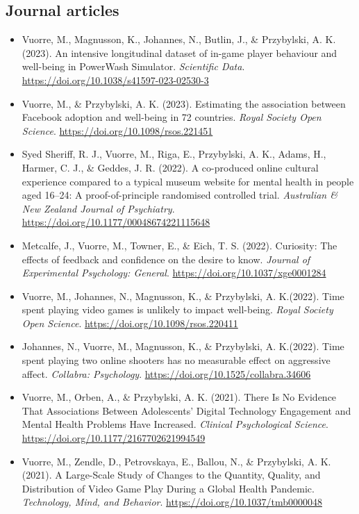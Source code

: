 \documentclass[12pt, a4paper]{article}
\newcommand{\years}[1]{\marginnote{\scriptsize #1}}
\begin{document}
\subsection*{Journal articles}
\begin{itemize}
  \item \years{2023} Vuorre, M., Magnusson, K., Johannes, N., Butlin, J., \& Przybylski, A. K. (2023). An intensive longitudinal dataset of in-game player behaviour and well-being in PowerWash Simulator. \emph{Scientific Data}. \url{https://doi.org/10.1038/s41597-023-02530-3}
  \item Vuorre, M., \& Przybylski, A. K. (2023). Estimating the association between Facebook adoption and well-being in 72 countries. \emph{Royal Society Open Science}. \url{https://doi.org/10.1098/rsos.221451}
  \item \years{2022} Syed Sheriff, R. J., Vuorre, M., Riga, E., Przybylski, A. K., Adams, H., Harmer, C. J., \& Geddes, J. R. (2022). A co-produced online cultural experience compared to a typical museum website for mental health in people aged 16–24: A proof-of-principle randomised controlled trial. \emph{Australian \& New Zealand Journal of Psychiatry}. \url{https://doi.org/10.1177/00048674221115648}
  \item Metcalfe, J., Vuorre, M., Towner, E., \& Eich, T. S. (2022). Curiosity: The effects of feedback and confidence on the desire to know. \emph{Journal of Experimental Psychology: General}. \url{https://doi.org/10.1037/xge0001284}
  \item Vuorre, M.\footnotemark[1], Johannes, N.\footnotemark[1], Magnusson, K., \& Przybylski, A. K.\footnotemark[1] (2022). Time spent playing video games is unlikely to impact well-being. \emph{Royal Society Open Science}. \url{https://doi.org/10.1098/rsos.220411}
  \item Johannes, N.\footnotemark[1], Vuorre, M.\footnotemark[1], Magnusson, K., \& Przybylski, A. K.\footnotemark[1] (2022). Time spent playing two online shooters has no measurable effect on aggressive affect. \emph{Collabra: Psychology}. \url{https://doi.org/10.1525/collabra.34606}
  \item \years{2021} Vuorre, M., Orben, A., \& Przybylski, A. K. (2021). There Is No Evidence That Associations Between Adolescents’ Digital Technology Engagement and Mental Health Problems Have Increased. \emph{Clinical Psychological Science}. \\ \url{https://doi.org/10.1177/2167702621994549}
  \item Vuorre, M., Zendle, D., Petrovskaya, E., Ballou, N., \& Przybylski, A. K. (2021). A Large-Scale Study of Changes to the Quantity, Quality, and Distribution of Video Game Play During a Global Health Pandemic. \emph{Technology, Mind, and Behavior}. \url{https://doi.org/10.1037/tmb0000048}

\end{itemize}
\end{document}
